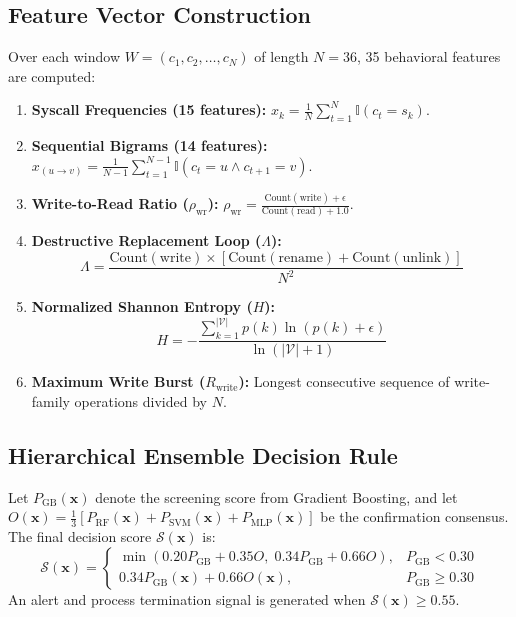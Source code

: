 \documentclass[conference]{IEEEtran}
\begin{document}
\subsection{Feature Vector Construction}
Over each window $W = (c_1, c_2, \dots, c_N)$ of length $N = 36$, 35 behavioral features are computed:
\begin{enumerate}
    \item \textbf{Syscall Frequencies (15 features):} $x_k = \frac{1}{N}\sum_{t=1}^N \mathbb{I}(c_t = s_k)$.
    \item \textbf{Sequential Bigrams (14 features):} $x_{(u \to v)} = \frac{1}{N-1}\sum_{t=1}^{N-1} \mathbb{I}(c_t = u \land c_{t+1} = v)$.
    \item \textbf{Write-to-Read Ratio ($\rho_{\text{wr}}$):} $\rho_{\text{wr}} = \frac{\text{Count}(\text{write}) + \epsilon}{\text{Count}(\text{read}) + 1.0}$.
    \item \textbf{Destructive Replacement Loop ($\Lambda$):}
    \begin{equation}
    \Lambda = \frac{\text{Count}(\text{write}) \times [\text{Count}(\text{rename}) + \text{Count}(\text{unlink})]}{N^2}
    \end{equation}
    \item \textbf{Normalized Shannon Entropy ($H$):}
    \begin{equation}
    H = -\frac{\sum_{k=1}^{|\mathcal{V}|} p(k) \ln(p(k) + \epsilon)}{\ln(|\mathcal{V}| + 1)}
    \end{equation}
    \item \textbf{Maximum Write Burst ($R_{\text{write}}$):} Longest consecutive sequence of write-family operations divided by $N$.
\end{enumerate}

\subsection{Hierarchical Ensemble Decision Rule}
Let $P_{\text{GB}}(\mathbf{x})$ denote the screening score from Gradient Boosting, and let $O(\mathbf{x}) = \frac{1}{3}[P_{\text{RF}}(\mathbf{x}) + P_{\text{SVM}}(\mathbf{x}) + P_{\text{MLP}}(\mathbf{x})]$ be the confirmation consensus. The final decision score $\mathcal{S}(\mathbf{x})$ is:
\begin{equation}
\mathcal{S}(\mathbf{x}) = \begin{cases} 
\min(0.20 P_{\text{GB}} + 0.35 O, \; 0.34 P_{\text{GB}} + 0.66 O), & P_{\text{GB}} < 0.30 \\ 
0.34 P_{\text{GB}}(\mathbf{x}) + 0.66 O(\mathbf{x}), & P_{\text{GB}} \ge 0.30 
\end{cases}
\end{equation}
An alert and process termination signal is generated when $\mathcal{S}(\mathbf{x}) \ge 0.55$.
\end{document}
